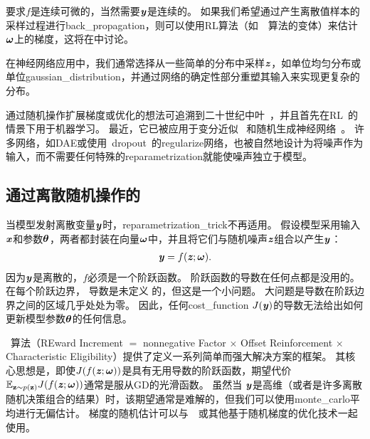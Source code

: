 要求$f$是连续可微的，当然需要$\boldsymbol{\mathit{y}}$是连续的。
如果我们希望通过产生离散值样本的采样过程进行\gls{back_propagation}，则可以使用\gls{RL}算法（如~~算法\citep{Williams-1992}的变体）来估计$\boldsymbol{\omega}$上的梯度，这将在中讨论。

在神经网络应用中，我们通常选择从一些简单的分布中采样$\boldsymbol{\mathit{z}}$，如单位均匀分布或单位\gls{gaussian_distribution}，并通过网络的确定性部分重塑其输入来实现更复杂的分布。

通过随机操作扩展梯度或优化的想法可追溯到二十世纪中叶~\citep{Price-1958,Bonnet-1964}，并且首先在\gls{RL}~\citep{Williams-1992}的情景下用于机器学习。
最近，它已被应用于变分近似~\citep{Opper+Archambeau-2009} 和随机生成神经网络~\citep{bengio2013estimating,Kingma-arxiv2013,Kingma+Welling-arxiv2014,Kingma+Welling-ICLR2014,Rezende-et-al-ICML2014,Goodfellow-et-al-NIPS2014-small}。
许多网络，如\gls{DAE}或使用~\gls{dropout}~的\gls{regularize}网络，也被自然地设计为将噪声作为输入，而不需要任何特殊的\gls{reparametrization}就能使噪声独立于模型。


\subsection{通过离散随机操作的}
\label{sec:back_propagating_through_discrete_stochastic_operations}

当模型发射离散变量$\boldsymbol{\mathit{y}}$时，\gls{reparametrization_trick}不再适用。
假设模型采用输入$\boldsymbol{\mathit{x}}$和参数$\boldsymbol{\theta}$，两者都封装在向量$\boldsymbol{\omega}$中，并且将它们与随机噪声$\boldsymbol{\mathit{z}}$组合以产生$\boldsymbol{\mathit{y}}$：
\begin{align}
 \boldsymbol{\mathit{y}} = f(\boldsymbol{\mathit{z}};\boldsymbol{\omega}).
\end{align}
因为$\boldsymbol{\mathit{y}}$是离散的，$f$必须是一个阶跃函数。
阶跃函数的导数在任何点都是没用的。
在每个阶跃边界， 导数是未定义 的，但这是一个小问题。
大问题是导数在阶跃边界之间的区域几乎处处为零。
因此，任何\gls{cost_function} $J(\boldsymbol{\mathit{y}})$的导数无法给出如何更新模型参数$\boldsymbol{\theta}$的任何信息。

~算法（REward Increment $=$ nonnegative Factor $\times$ Offset Reinforcement $\times$ Characteristic Eligibility）提供了定义一系列简单而强大解决方案的框架\citep{Williams-1992}。
其核心思想是，即使$J(f(\boldsymbol{\mathit{z}};\boldsymbol{\omega}))$是具有无用导数的阶跃函数，期望代价$\mathbb{E}_{\mathbf{z} \sim p(\mathbf{z})} J(f(\boldsymbol{\mathit{z}};\boldsymbol{\omega}))$通常是服从\gls{GD}的光滑函数。
虽然当 $\boldsymbol{\mathit{y}}$是高维（或者是许多离散随机决策组合的结果）时，该期望通常是难解的，但我们可以使用\gls{monte_carlo}平均进行无偏估计。
梯度的随机估计可以与~~或其他基于随机梯度的优化技术一起使用。


